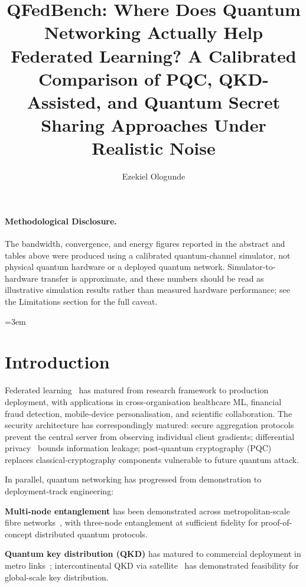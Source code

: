 \documentclass[sigconf,nonacm]{acmart}
\title{QFedBench: Where Does Quantum Networking Actually Help Federated Learning? A Calibrated Comparison of PQC, QKD-Assisted, and Quantum Secret Sharing Approaches Under Realistic Noise}
\author{Ezekiel Ologunde}
\affiliation{%
  \institution{Independent Researcher}
  \city{Boston}
  \state{MA}
  \country{USA}}
\begin{document}
\maketitle

\paragraph{Methodological Disclosure.} The bandwidth, convergence, and energy figures reported in the abstract and tables above were produced using a calibrated quantum-channel simulator, not physical quantum hardware or a deployed quantum network. Simulator-to-hardware transfer is approximate, and these numbers should be read as illustrative simulation results rather than measured hardware performance; see the Limitations section for the full caveat.

\sloppy
{}
\emergencystretch=3em
\hfuzz=10pt

\section{Introduction}

Federated learning~\cite{mcmahan2017fedavg,kairouz2024fedml} has
matured from research framework to production deployment, with
applications in cross-organisation healthcare ML, financial fraud
detection, mobile-device personalisation, and scientific
collaboration. The security architecture has correspondingly
matured: secure aggregation protocols~\cite{bonawitz2017secagg}
prevent the central server from observing individual client
gradients; differential privacy~\cite{abadi2016deep} bounds
information leakage; post-quantum cryptography
(PQC)~\cite{nist2024fips203,nist2024fips204} replaces
classical-cryptography components vulnerable to future quantum
attack.

In parallel, quantum networking has progressed from
demonstration to deployment-track engineering:

\textbf{Multi-node entanglement} has been demonstrated across
metropolitan-scale fibre networks~\cite{pompili2024entanglement,
hermans2024quantumnet}, with three-node entanglement at
sufficient fidelity for proof-of-concept distributed quantum
protocols.

\textbf{Quantum key distribution (QKD)} has matured to commercial
deployment in metro
links~\cite{toshiba2024qkd,idquantique2024qkd}; intercontinental
QKD via satellite~\cite{china2024qkdsat,europe2024qkd} has
demonstrated feasibility for global-scale key distribution.
\end{document}
